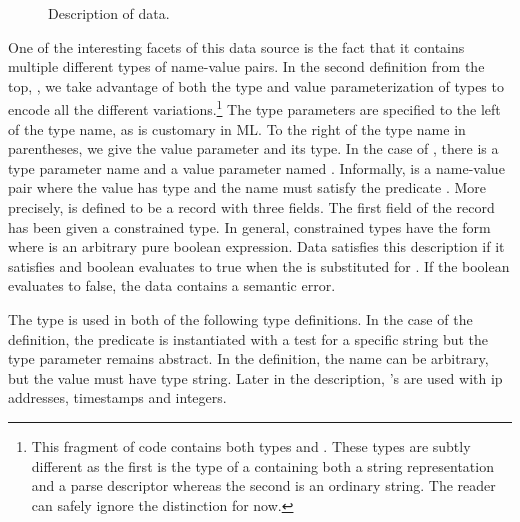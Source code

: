 
\begin{figure}
  \centering
  \small
  
  \caption{Description of \darkstar{} data.}
  \label{fig:darkstar-ml}
\end{figure}

One of the interesting facets of this data source is the fact that
it contains multiple different types of name-value pairs.  In the
second definition from the top, , we take
advantage of both the type and value parameterization of types to
encode all the different 
variations.\footnote{This fragment of code contains both
types  and .  These types are subtly different
as the first is the type of a \pvalue{} containing both a string 
representation and a parse descriptor whereas the second is an 
ordinary string.  The reader can safely ignore the distinction for now.}    
The type parameters
are specified to the left of the type name, as is customary in ML.
To the right of the type name in parentheses, we give the
value parameter and its type. 
In the case of , there is a type parameter name 
and a value parameter named .  Informally,
 is a name-value pair where the value has type 
and the name must satisfy the predicate .  More precisely,
 is defined to be
a record with three fields.  The first field of the record
has been given a constrained type.  In general, constrained types have the
form  where  is an arbitrary pure boolean 
expression.  Data  satisfies this description if it satisfies
 and boolean  evaluates to true when the \pvalue{} 
is substituted for .  If the boolean evaluates to false, the
data contains a semantic error.  

The  type is used in both of the following type definitions.
In the case of the  definition, the predicate is instantiated
with a test for a specific string but the type parameter remains 
abstract.  In the  
definition, the name can be arbitrary, but the value must have 
type string. Later in the description, 's
are used with ip addresses, timestamps and integers. 

